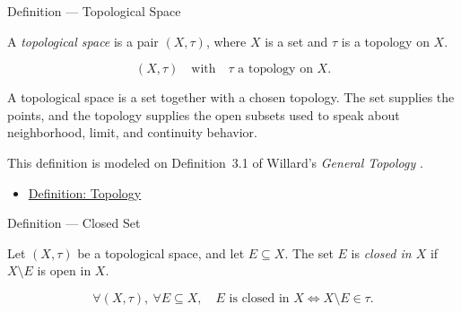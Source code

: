 \begin{definitionbox}{Definition --- Topological Space}
\begin{definition}\label{def:topological-space}
A \emph{topological space} is a pair \((X,\tau)\), where \(X\) is a set and
\(\tau\) is a topology on \(X\).
\end{definition}
\end{definitionbox}

\begin{remark*}
\[
(X,\tau)
\quad\text{with}\quad
\tau \text{ a topology on } X.
\]
\end{remark*}

\begin{remark*}[Interpretation]
A topological space is a set together with a chosen topology.  The set
supplies the points, and the topology supplies the open subsets used to speak
about neighborhood, limit, and continuity behavior.
\end{remark*}

\begin{remark*}
This definition is modeled on Definition~3.1 of Willard's
\emph{General Topology} \cite{WillardGeneralTopology}.
\end{remark*}


\begin{dependencies}
\begin{itemize}
  \item \hyperref[def:topology-on-set]{Definition: Topology}
\end{itemize}
\end{dependencies}

\begin{definitionbox}{Definition --- Closed Set}
\begin{definition}\label{def:topological-closed-set}
Let \((X,\tau)\) be a topological space, and let \(E\subseteq X\).  The set
\(E\) is \emph{closed in \(X\)} if \(X\setminus E\) is open in \(X\).
\end{definition}
\end{definitionbox}

\begin{remark*}
\[
\forall (X,\tau),\ \forall E\subseteq X,\quad
E\text{ is closed in }X
\Longleftrightarrow
X\setminus E\in\tau.
\]
\end{remark*}

